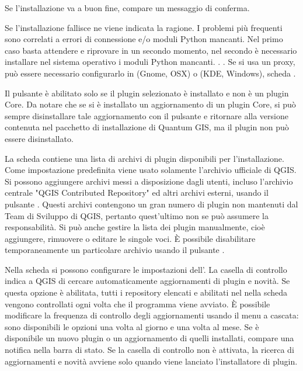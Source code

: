 Se l'installazione va a buon fine, compare un messaggio di conferma. 

Se l'installazione fallisce ne viene indicata la ragione. I problemi più frequenti sono correlati a errori di 
connessione e/o moduli Python mancanti. Nel primo caso basta attendere e riprovare in un secondo momento, 
nel secondo è necessario installare nel sistema operativo i moduli Python mancanti. . . Se si usa un proxy, può essere necessario configurarlo in
 \arrow {} (Gnome, OSX)
o  \arrow {} (KDE, Windows), scheda .

Il pulsante  è abilitato solo se il plugin selezionato è installato e non è un plugin Core. 
Da notare che se si è installato un aggiornamento di un plugin Core, si può sempre disinstallare tale 
aggiornamento con il pulsante  e ritornare alla versione contenuta nel pacchetto di 
installazione di Quantum GIS, ma il plugin non può essere disinstallato.


La scheda  contiene una lista di archivi di plugin disponibili per l'installazione. 
Come impostazione predefinita viene usato solamente l'archivio ufficiale di QGIS. 
Si possono aggiungere archivi messi a disposizione dagli utenti, incluso l'archivio centrale "QGIS Contributed Repository" 
ed altri archivi esterni, usando il pulsante . Questi archivi contengono un gran 
numero di plugin non mantenuti dal Team di Sviluppo di QGIS, pertanto quest'ultimo non se può assumere la responsabilità.
Si può anche gestire la lista dei plugin manualmente, cioè aggiungere, rimuovere o editare le singole voci. 
È possibile disabilitare temporaneamente un particolare archivio usando il pulsante .


Nella scheda  si possono configurare le impostazioni dell'. 
La casella di controllo  indica a QGIS di cercare automaticamente aggiornamenti 
di plugin e novità. Se questa opzione è abilitata, tutti i repository elencati e abilitati nel 
nella scheda  vengono controllati ogni volta che il programma viene avviato. 
È possibile modificare la frequenza di controllo degli aggiornamenti usando il menu a cascata: sono disponibili le opzioni
una volta al giorno e una volta al mese. Se è disponibile un nuovo plugin o un aggiornamento di quelli 
installati, compare una notifica nella barra di stato. Se la casella di controllo non è attivata, la ricerca di aggiornamenti e 
novità avviene solo quando viene lanciato l'installatore di plugin.

